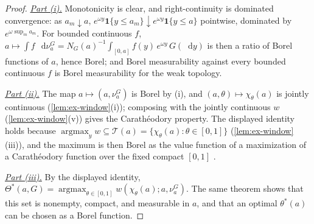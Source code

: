 \documentclass[12pt,reqno]{article}
\newcommand{\de}{\mathop{}\!\mathrm{d}}
\theoremstyle{definition} \newtheorem{example}{Example}
\theoremstyle{definition} \newtheorem{condition}{Condition}
\theoremstyle{definition} \newtheorem{corollary}{Corollary}
\theoremstyle{definition} \newtheorem{claim}{Claim}
\theoremstyle{definition} \newtheorem{definition}{Definition}
\theoremstyle{definition} \newtheorem{conjecture}{Conjecture}
\theoremstyle{definition} \newtheorem{Lemma}{Lemma}
\theoremstyle{definition} \newtheorem{lemma}{Lemma}
\theoremstyle{plain} \newtheorem{theorem}{Theorem}
\theoremstyle{definition} \newtheorem{assumption}{Assumption}
\theoremstyle{definition} \newtheorem*{assumptionnonumber}{Assumption}
\theoremstyle{definition} \newtheorem*{theoremNoNumber}{Proposition}
\theoremstyle{definition}
\theoremstyle{definition}\newtheorem{proposition}{Proposition}
\theoremstyle{definition} \newtheorem{result}{Result}
\theoremstyle{definition} \newtheorem*{definitionNoNumber}{Definition}
\theoremstyle{definition} \newtheorem{Definition}{Definition}
\theoremstyle{definition} \newtheorem*{DefinitionNoNumber}{Definition}
\theoremstyle{definition} \newtheorem*{fact}{Fact}
\theoremstyle{definition} \newtheorem*{property}{Property}
\DeclareMathOperator*{\argmax}{argmax}
\theoremstyle{definition} \newtheorem{remark}{Remark}
\begin{document}
\begin{proof} 
\noindent \underline{\emph{Part (i).}} Monotonicity is clear, and right-continuity is dominated convergence: as $a_m\downarrow a$, $e^{\omega y}\mathbf 1\{y\le a_m\}\downarrow e^{\omega y}\mathbf 1\{y\le a\}$ pointwise, dominated by $e^{\omega\sup_m a_m}$. For bounded continuous $f$, $a\mapsto\int f\,\de\nu^G_a=N_G(a)^{-1}\int_{[0,a]}f(y)\,e^{\omega y}\,G(\de y)$ is then a ratio of Borel functions of $a$, hence Borel; and Borel measurability against every bounded continuous $f$ is Borel measurability for the weak topology.

\noindent \underline{\emph{Part (ii).}} The map $a\mapsto(a,\nu^G_a)$ is Borel by (i), and $(a,\theta)\mapsto\chi_\theta(a)$ is jointly continuous (\cref{lem:ex-window}(i)); composing with the jointly continuous $w$ (\cref{lem:ex-window}(v)) gives the Carath\'eodory property. The displayed identity holds because $\argmax_y w\subseteq\mathcal T(a)=\{\chi_\theta(a):\theta\in[0,1]\}$ (\cref{lem:ex-window}(iii)), and the maximum is then Borel as the value function of a maximization of a Carath\'eodory function over the fixed compact $[0,1]$ \citep[Measurable Maximum Theorem~18.19]{aliprantis2006infinite}.

\noindent \underline{\emph{Part (iii).}} By the displayed identity, $\Theta^\ast(a,G)=\argmax_{\theta\in[0,1]}w(\chi_\theta(a);a,\nu^G_a)$. The same theorem shows that this set is nonempty, compact, and measurable in $a$, and that an optimal $\theta^\ast(a)$ can be chosen as a Borel function.
\end{proof}
\end{document}
